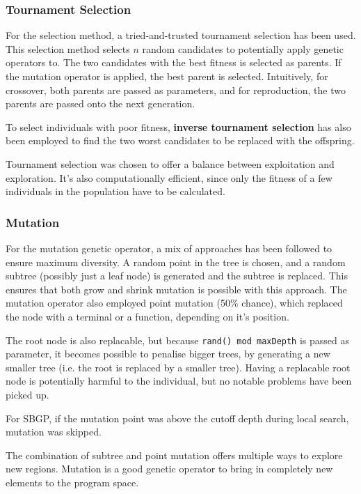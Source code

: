 \documentclass{article}
\begin{document}
\subsubsection{Tournament Selection}
\label{selection}
For the selection method, a tried-and-trusted tournament selection has been used. This selection method selects \(n\) random candidates to potentially apply genetic operators to. The two candidates with the best fitness is selected as parents. If the mutation operator is applied, the best parent is selected. Intuitively, for crossover, both parents are passed as parameters, and for reproduction, the two parents are passed onto the next generation.

To select individuals with poor fitness, \textbf{inverse tournament selection} has also been employed to find the two worst candidates to be replaced with the offspring.

Tournament selection was chosen to offer a balance between exploitation and exploration. It's also computationally efficient, since only the fitness of a few individuals in the population have to be calculated.

\subsubsection{Mutation}
For the mutation genetic operator, a mix of approaches has been followed to ensure maximum diversity. A random point in the tree is chosen, and a random subtree (possibly just a leaf node) is generated and the subtree is replaced. This ensures that both grow and shrink mutation is possible with this approach. The mutation operator also employed point mutation (50\% chance), which replaced the node with a terminal or a function, depending on it's position.

The root node is also replacable, but because \texttt{rand() mod maxDepth} is passed as parameter, it becomes possible to penalise bigger trees, by generating a new smaller tree (i.e. the root is replaced by a smaller tree). Having a replacable root node is potentially harmful to the individual, but no notable problems have been picked up.

For SBGP, if the mutation point was above the cutoff depth during local search, mutation was skipped.

The combination of subtree and point mutation offers multiple ways to explore new regions. Mutation is a good genetic operator to bring in completely new elements to the program space.
\end{document}

